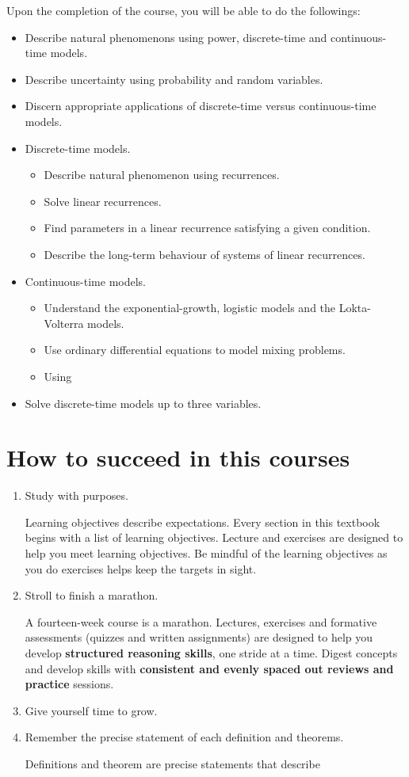 \documentclass[../book.tex]{subfiles}
\begin{document}
Upon the completion of the course, you will be able to do the followings:

\begin{itemize}
  \item Describe natural phenomenons using power, discrete-time and continuous-time models.
  \item Describe uncertainty using probability and random variables.
  \item Discern appropriate applications of discrete-time versus continuous-time models.
  \item Discrete-time models.
  \begin{itemize}
    \item Describe natural phenomenon using recurrences.
    \item Solve linear recurrences.
    \item Find parameters in a linear recurrence satisfying a given condition.
    \item Describe the long-term behaviour of systems of linear recurrences.
  \end{itemize}
  \item Continuous-time models.
  \begin{itemize}
    \item Understand the exponential-growth, logistic models and the Lokta-Volterra models.
    \item Use ordinary differential equations to model mixing problems.
    \item Using
  \end{itemize}
  \item Solve discrete-time models up to three variables.
\end{itemize}

\section*{How to succeed in this courses}

\begin{enumerate}
  \item Study with purposes.
  
  Learning objectives describe expectations.  Every section in this textbook begins with a list of learning objectives.  Lecture and exercises are designed to help you meet learning objectives.  Be mindful of the learning objectives as you do exercises helps keep the targets in sight.
  \item Stroll to finish a marathon.
  
  A fourteen-week course is a marathon.  Lectures, exercises and formative assessments (quizzes and written assignments) are designed to help you develop \textbf{structured reasoning skills}, one stride at a time.  Digest concepts and develop skills with \textbf{consistent and evenly spaced out reviews and practice} sessions.
  \item Give yourself time to grow.
  \item Remember the precise statement of each definition and theorems.
  
  Definitions and theorem are precise statements that describe
\end{enumerate}
\end{document}

